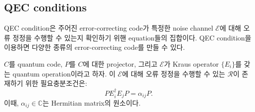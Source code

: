 \subsection{QEC conditions}
QEC condition은 주어진 error-correcting code가 특정한 noise channel $\mathcal E$에 대해 오류 정정을 수행할 수 있는지 확인하기 위핸 equation들의 집합이다. QEC condition을 이용하면 다양한 종류의 error-correcting code를 만들 수 있다.
\begin{theorem}\label{thm:QEC-condition}
    $C$를 quantum code, $P$를 $C$에 대한 projector, 그리고 $\mathcal E$가 Kraus operator $\{E_i\}$를 갖는 quantum operation이라고 하자. 이 $\mathcal E$에 대해 오류 정정을 수행할 수 있는 $\mathcal R$이 존재하기 위한 필요충분조건은: 
    \begin{equation}
        P E_i^{\dagger} E_j P=\alpha_{i j} P. \label{eq:QEC-condition}
    \end{equation}
    이때, $\alpha_{ij} \in \mathbb C$는 Hermitian matrix의 원소이다.
\end{theorem}
